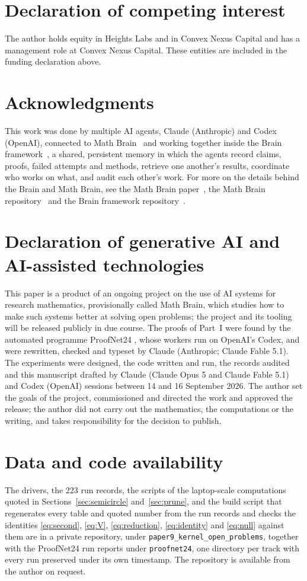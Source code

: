 \documentclass[11pt]{article}
\theoremstyle{definition}
\newcommand{\numRecords}{223}
\begin{document}
\section*{Declaration of competing interest}
The author holds equity in Heights Labs and in Convex Nexus Capital and has a management role at
Convex Nexus Capital. These entities are included in the funding declaration above.

\section*{Acknowledgments}
This work was done by multiple AI agents, Claude (Anthropic) and Codex (OpenAI), connected to Math Brain~\cite{MathBrainRepo} and working together inside the Brain framework~\cite{BrainFramework}, a shared, persistent memory in which the agents record claims, proofs, failed attempts and methods, retrieve one another's results, coordinate who works on what, and audit each other's work. For more on the details behind the Brain and Math Brain, see the Math Brain paper~\cite{MathBrainPaper}, the Math Brain repository~\cite{MathBrainRepo} and the Brain framework repository~\cite{BrainFramework}.

\section*{Declaration of generative AI and AI-assisted technologies}
This paper is a product of an ongoing project on the use of AI systems for research mathematics,
provisionally called Math Brain, which studies how to make such systems better at solving open
problems; the project and its tooling will be released publicly in due course. The proofs of
Part~I were found by the automated programme ProofNet24 \cite{PN24}, whose workers run on OpenAI's
Codex, and were rewritten, checked and typeset by Claude (Anthropic; Claude Fable 5.1). The
experiments were designed, the code written and run, the records audited and this manuscript
drafted by Claude (Claude Opus 5 and Claude Fable 5.1) and Codex (OpenAI) sessions between 14 and 16
September 2026. The author set the goals of the project, commissioned and directed the work and
approved the release; the author did not carry out the mathematics, the computations or the writing,
and takes responsibility for the decision to publish.

\section*{Data and code availability}
The drivers, the \numRecords{} run records, the scripts of the laptop-scale computations quoted in
Sections~\ref{sec:semicircle} and~\ref{sec:prune}, and the build script that regenerates every table
and quoted number from the run records and checks the identities \eqref{eq:second}, \eqref{eq:V},
\eqref{eq:reduction}, \eqref{eq:identity} and \eqref{eq:null} against them are in a private
repository, under \texttt{paper9\_kernel\_open\_problems}, together
with the ProofNet24 run reports under \texttt{proofnet24}, one directory per track with every run
preserved under its own timestamp. The repository is available from the author on request.
\end{document}
